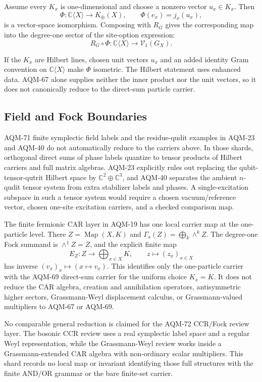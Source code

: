 Assume every \(K_x\) is one-dimensional and choose a nonzero vector
\(u_x\in K_x\).  Then
\[
  \Phi:\mathbb C\langle X\rangle
  \longrightarrow
  K_{\oplus}(X),
  \qquad
  \Phi(e_x)=j_x(u_x),
\]
is a vector-space isomorphism.  Composing with \(R_G\) gives the corresponding
map into the degree-one sector of the site-option expression:
\[
  R_G\circ\Phi:\mathbb C\langle X\rangle\longrightarrow \mathcal V_1(G_X).
\]

If the \(K_x\) are Hilbert lines, chosen unit vectors \(u_x\) and an added
identity Gram convention on \(\mathbb C\langle X\rangle\) make \(\Phi\)
isometric.  The Hilbert statement uses enhanced data.  AQM-67 alone supplies
neither the inner product nor the unit vectors, so it does not canonically
reduce to the direct-sum particle carrier.

\subsection{Field and Fock Boundaries}

AQM-71 finite symplectic field labels and the residue-qudit examples in
AQM-23 and AQM-40 do not automatically reduce to the carriers above.  In
those shards, orthogonal direct sums of phase labels quantize to tensor
products of Hilbert carriers and full matrix algebras.  AQM-23 explicitly
rules out replacing the qubit-tensor-qutrit Hilbert space by
\(\mathbb C^2\oplus\mathbb C^3\), and AQM-40 separates the ambient
\(n\)-qudit tensor system from extra stabilizer labels and phases.  A
single-excitation subspace in such a tensor system would require a chosen
vacuum/reference vector, chosen one-site excitation carriers, and a checked
comparison map.

The finite fermionic CAR layer in AQM-19 has one local carrier map at the
one-particle level.  There \(Z=\operatorname{Map}(X,K)\) and
\(\Gamma_{\mathrm a}(Z)=\bigoplus_k\wedge^k Z\).  The degree-one Fock summand
is \(\wedge^1 Z=Z\), and the explicit finite map
\[
  E_Z:Z\longrightarrow \bigoplus_{x\in X}K,\qquad
  z\longmapsto (z_x)_{x\in X}
\]
has inverse \((v_x)_x\mapsto (x\mapsto v_x)\).  This identifies only the
one-particle carrier with the AQM-69 direct-sum carrier for the uniform choice
\(K_x=K\).  It does not reduce the CAR algebra, creation and annihilation
operators, antisymmetric higher sectors, Grassmann-Weyl displacement calculus,
or Grassmann-valued multipliers to AQM-67 or AQM-69.

No comparable general reduction is claimed for the AQM-72 CCR/Fock review
layer.  The bosonic CCR review uses a real symplectic label space and a
regular Weyl representation, while the Grassmann-Weyl review works inside a
Grassmann-extended CAR algebra with non-ordinary scalar multipliers.  This
shard records no local map or invariant identifying those full structures
with the finite AND/OR grammar or the bare finite-set carrier.

